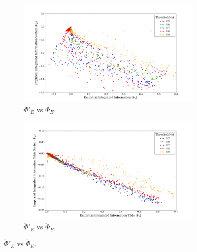 \documentclass[a4paper,11pt]{article}
\begin{document}
\begin{figure}[H] 
	\label{fig:phi-vs-phi-sorted} 
	\begin{minipage}[b]{0.5\linewidth}
		\begin{figure}[H]
		\begin{center}
		\includegraphics[scale = 0.2]{figures/phi_sorted_vs_phi}
		\caption{
			$\Phi'_E$ vs $\Phi_E$.
			\label{fig:phi_sorted_vs_phi}
		}
		\end{center}
		\end{figure}
		\vspace{2ex}
	\end{minipage}
	\begin{minipage}[b]{0.5\linewidth}
		\begin{figure}[H]
		\begin{center}
		\includegraphics[scale = 0.2]{figures/phi_tilde_sorted_vs_phi_tilde}
		\caption{
			$\widetilde{\Phi}'_E$ vs $\widetilde{\Phi}_E$.
			\label{fig:phi_tilde_sorted_vs_phi_tilde}
		}
		\end{center}
		\end{figure}
		\vspace{2ex}
	\end{minipage}
\end{figure}
\end{document}
